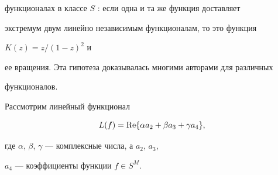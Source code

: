 функционалах в классе $S$ \cite{5}: если одна и та же функция доставляет


экстремум двум линейно независимым функционалам, то это функция


$K(z)=z/(1-z)^2$ и


ее вращения. Эта гипотеза доказывалась многими авторами для различных


функционалов.





Рассмотрим линейный функционал


\begin{equation}


L(f)=\re\{\alpha a_2+\beta a_3+\gamma a_4\},


\end{equation}


где $\alpha$, $\beta$, $\gamma$ --- комплексные числа, а $a_2$, $a_3$,


$a_4$ --- коэффициенты функции $f\in S^M$.





